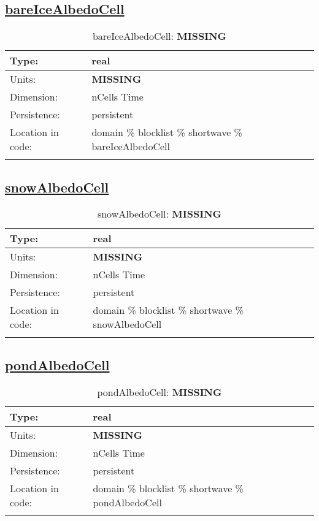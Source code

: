 \subsection[bareIceAlbedoCell]{\hyperref[sec:var_tab_shortwave]{bareIceAlbedoCell}}
\label{subsec:var_sec_shortwave_bareIceAlbedoCell}
\begin{center}
\begin{longtable}{| p{2.0in} | p{4.0in} |}
        \hline 
        Type: & real \\
        \hline 
        Units: & {\bf \color{red} MISSING} \\
        \hline 
        Dimension: & nCells Time \\
        \hline 
        Persistence: & persistent \\
        \hline 
         Location in code: & domain \% blocklist \% shortwave \% bareIceAlbedoCell \\
         \hline 
    \caption{bareIceAlbedoCell: {\bf \color{red} MISSING}}
\end{longtable}
\end{center}
\subsection[snowAlbedoCell]{\hyperref[sec:var_tab_shortwave]{snowAlbedoCell}}
\label{subsec:var_sec_shortwave_snowAlbedoCell}
\begin{center}
\begin{longtable}{| p{2.0in} | p{4.0in} |}
        \hline 
        Type: & real \\
        \hline 
        Units: & {\bf \color{red} MISSING} \\
        \hline 
        Dimension: & nCells Time \\
        \hline 
        Persistence: & persistent \\
        \hline 
         Location in code: & domain \% blocklist \% shortwave \% snowAlbedoCell \\
         \hline 
    \caption{snowAlbedoCell: {\bf \color{red} MISSING}}
\end{longtable}
\end{center}
\subsection[pondAlbedoCell]{\hyperref[sec:var_tab_shortwave]{pondAlbedoCell}}
\label{subsec:var_sec_shortwave_pondAlbedoCell}
\begin{center}
\begin{longtable}{| p{2.0in} | p{4.0in} |}
        \hline 
        Type: & real \\
        \hline 
        Units: & {\bf \color{red} MISSING} \\
        \hline 
        Dimension: & nCells Time \\
        \hline 
        Persistence: & persistent \\
        \hline 
         Location in code: & domain \% blocklist \% shortwave \% pondAlbedoCell \\
         \hline 
    \caption{pondAlbedoCell: {\bf \color{red} MISSING}}
\end{longtable}
\end{center}
